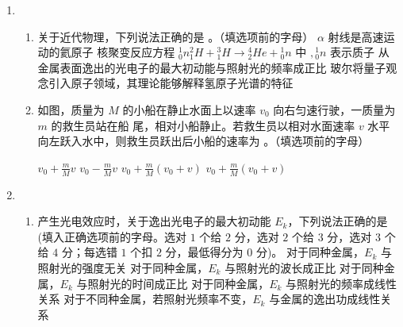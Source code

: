 \begin{enumerate}
\begin{enumerate}

	
\end{enumerate}



\item 
{}
\begin{enumerate}
	\item
关于近代物理，下列说法正确的是 \underlinegap 。（填选项前的字母）
\fourchoices
{$ \alpha $ 射线是高速运动的氦原子}
{核聚变反应方程 ${ }_{0}^{1} n{ }_{1}^{2} H+{ }_{1}^{3} H \rightarrow{ }_{2}^{4} H e+{ }_{0}^{1} n$ 中 $,{ }_{0}^{1} n$ 表示质子}
{从金属表面逸出的光电子的最大初动能与照射光的频率成正比}
{玻尔将量子观念引入原子领域，其理论能够解释氢原子光谱的特征}


\item 
如图，质量为 $ M $ 的小船在静止水面上以速率 $ v_{0} $ 向右匀速行驶，一质量为 $ m $ 的救生员站在船
尾，相对小船静止。若救生员以相对水面速率 $ v $ 水平向左跃入水中，则救生员跃出后小船的速率为 \underlinegap 。（填选项前的字母）
\begin{figure}[h!]
	\centering
	
\end{figure}
\fourchoices
{$v_{0}+\frac{m}{M} v$}
{$v_{0}-\frac{m}{M} v$}
{$v_{0}+\frac{m}{M}\left(v_{0}+v\right)$}
{$v_{0}+\frac{m}{M}\left(v_{0}+v\right)$}



\end{enumerate}


\item 
{}
\begin{enumerate}
	\item
产生光电效应时，关于逸出光电子的最大初动能 $ E_{k} $，下列说法正确的是 \underlinegap 
(填入正确选项前的字母。选对 $ 1 $ 个给 $ 2 $ 分，选对 $ 2 $ 个给 $ 3 $ 分，选对 $ 3 $ 个给 $ 4 $
分；每选错 $ 1 $ 个扣 $ 2 $ 分，最低得分为 $ 0 $ 分)。
\fivechoices
{对于同种金属，$ E_{k} $ 与照射光的强度无关}
{对于同种金属，$ E_{k} $ 与照射光的波长成正比}
{对于同种金属，$ E_{k} $ 与照射光的时间成正比}
{对于同种金属，$ E_{k} $ 与照射光的频率成线性关系}
{对于不同种金属，若照射光频率不变，$ E_{k} $ 与金属的逸出功成线性关系}




\end{enumerate}
\end{enumerate}
